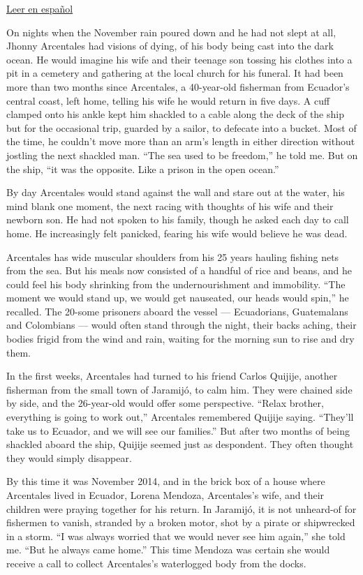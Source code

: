 \href{https://www.nytimes3xbfgragh.onion/es/2017/11/21/guardia-costera-eeuu-prisiones-alta-mar}{Leer
en español}

On nights when the November rain poured down and he had not slept at
all, Jhonny Arcentales had visions of dying, of his body being cast into
the dark ocean. He would imagine his wife and their teenage son tossing
his clothes into a pit in a cemetery and gathering at the local church
for his funeral. It had been more than two months since Arcentales, a
40-year-old fisherman from Ecuador's central coast, left home, telling
his wife he would return in five days. A cuff clamped onto his ankle
kept him shackled to a cable along the deck of the ship but for the
occasional trip, guarded by a sailor, to defecate into a bucket. Most of
the time, he couldn't move more than an arm's length in either direction
without jostling the next shackled man. ``The sea used to be freedom,''
he told me. But on the ship, ``it was the opposite. Like a prison in the
open ocean.''

By day Arcentales would stand against the wall and stare out at the
water, his mind blank one moment, the next racing with thoughts of his
wife and their newborn son. He had not spoken to his family, though he
asked each day to call home. He increasingly felt panicked, fearing his
wife would believe he was dead.

Arcentales has wide muscular shoulders from his 25 years hauling fishing
nets from the sea. But his meals now consisted of a handful of rice and
beans, and he could feel his body shrinking from the undernourishment
and immobility. ``The moment we would stand up, we would get nauseated,
our heads would spin,'' he recalled. The 20-some prisoners aboard the
vessel --- Ecuadorians, Guatemalans and Colombians --- would often stand
through the night, their backs aching, their bodies frigid from the wind
and rain, waiting for the morning sun to rise and dry them.

In the first weeks, Arcentales had turned to his friend Carlos Quijije,
another fisherman from the small town of Jaramijó, to calm him. They
were chained side by side, and the 26-year-old would offer some
perspective. ``Relax brother, everything is going to work out,''
Arcentales remembered Quijije saying. ``They'll take us to Ecuador, and
we will see our families.'' But after two months of being shackled
aboard the ship, Quijije seemed just as despondent. They often thought
they would simply disappear.

By this time it was November 2014, and in the brick box of a house where
Arcentales lived in Ecuador, Lorena Mendoza, Arcentales's wife, and
their children were praying together for his return. In Jaramijó, it is
not unheard-of for fishermen to vanish, stranded by a broken motor, shot
by a pirate or shipwrecked in a storm. ``I was always worried that we
would never see him again,'' she told me. ``But he always came home.''
This time Mendoza was certain she would receive a call to collect
Arcentales's waterlogged body from the docks.

